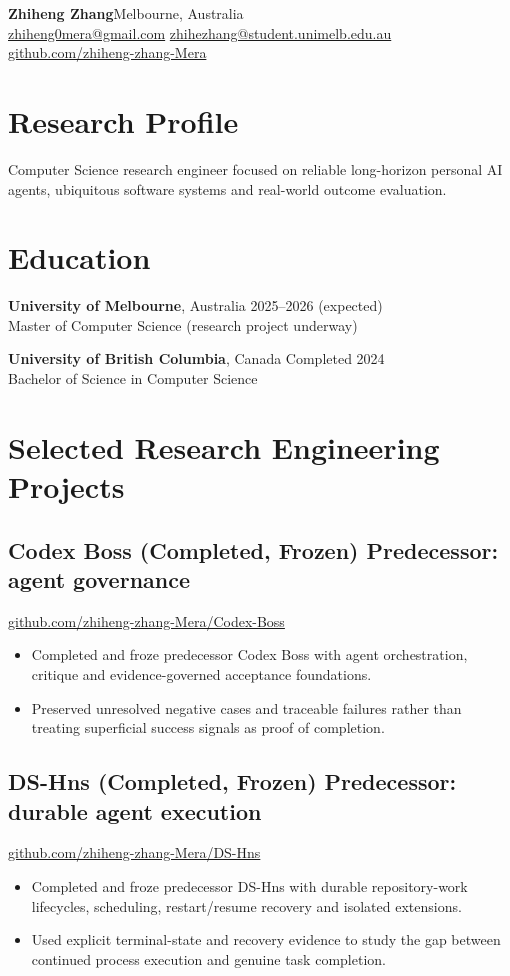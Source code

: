 \documentclass[10pt,a4paper]{article}
\begin{document}
{\LARGE\bfseries Zhiheng Zhang}\hfill Melbourne, Australia\\
\href{mailto:zhiheng0mera@gmail.com}{zhiheng0mera@gmail.com}\quad
\href{mailto:zhihezhang@student.unimelb.edu.au}{zhihezhang@student.unimelb.edu.au}\\
\href{https://github.com/zhiheng-zhang-Mera}{github.com/zhiheng-zhang-Mera}

\section{Research Profile}
Computer Science research engineer focused on reliable long-horizon personal AI agents, ubiquitous software systems and real-world outcome evaluation.

\section{Education}
\textbf{University of Melbourne}, Australia \hfill 2025--2026 (expected)\\
Master of Computer Science (research project underway)

\textbf{University of British Columbia}, Canada \hfill Completed 2024\\
Bachelor of Science in Computer Science

\section{Selected Research Engineering Projects}
\subsection*{Codex Boss (Completed, Frozen) \hfill \small Predecessor: agent governance}
\href{https://github.com/zhiheng-zhang-Mera/Codex-Boss}{github.com/zhiheng-zhang-Mera/Codex-Boss}
\begin{itemize}
\item Completed and froze predecessor Codex Boss with agent orchestration, critique and evidence-governed acceptance foundations.
\item Preserved unresolved negative cases and traceable failures rather than treating superficial success signals as proof of completion.
\end{itemize}

\subsection*{DS-Hns (Completed, Frozen) \hfill \small Predecessor: durable agent execution}
\href{https://github.com/zhiheng-zhang-Mera/DS-Hns}{github.com/zhiheng-zhang-Mera/DS-Hns}
\begin{itemize}
\item Completed and froze predecessor DS-Hns with durable repository-work lifecycles, scheduling, restart/resume recovery and isolated extensions.
\item Used explicit terminal-state and recovery evidence to study the gap between continued process execution and genuine task completion.
\end{itemize}
\end{document}
